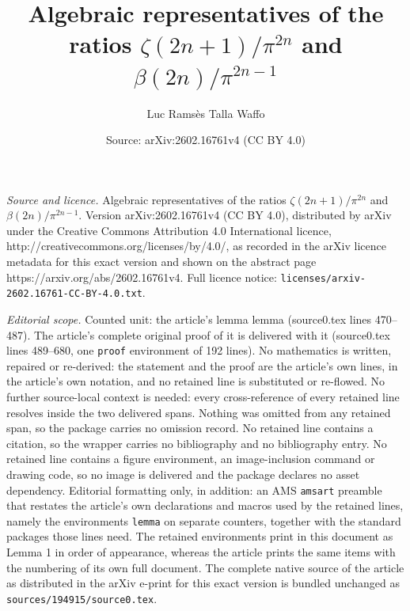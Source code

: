 \documentclass[10pt,a4paper]{amsart}
\title{Algebraic representatives of the ratios $\zeta(2n+1)/\pi^{2n}$ and $\beta(2n)/\pi^{2n-1}$}
\author{Luc Rams\`es Talla Waffo}
\date{Source: arXiv:2602.16761v4 (CC BY 4.0)}
\newtheorem{lemma}{Lemma}
\begin{document}
\maketitle

\noindent\emph{Source and licence.} Algebraic representatives of the ratios $\zeta(2n+1)/\pi^{2n}$ and $\beta(2n)/\pi^{2n-1}$. Version arXiv:2602.16761v4 (CC BY 4.0), distributed by arXiv under the Creative Commons Attribution 4.0 International licence, http://creativecommons.org/licenses/by/4.0/, as recorded in the arXiv licence metadata for this exact version and shown on the abstract page https://arxiv.org/abs/2602.16761v4. Full licence notice: \texttt{licenses/arxiv-2602.16761-CC-BY-4.0.txt}.\par\smallskip

\noindent\textit{Editorial scope.} Counted unit: the article's lemma lemma (source0.tex lines 470--487). The article's complete original proof of it is delivered with it (source0.tex lines 489--680, one \texttt{proof} environment of 192 lines). No mathematics is written, repaired or re-derived: the statement and the proof are the article's own lines, in the article's own notation, and no retained line is substituted or re-flowed.  No further source-local context is needed: every cross-reference of every retained line resolves inside the two delivered spans.  Nothing was omitted from any retained span, so the package carries no omission record.  No retained line contains a citation, so the wrapper carries no bibliography and no bibliography entry.  No retained line contains a figure environment, an image-inclusion command or drawing code, so no image is delivered and the package declares no asset dependency.  Editorial formatting only, in addition: an AMS \texttt{amsart} preamble that restates the article's own declarations and macros used by the retained lines, namely the environments \texttt{lemma} on separate counters, together with the standard packages those lines need.  The retained environments print in this document as Lemma 1 in order of appearance, whereas the article prints the same items with the numbering of its own full document.  The complete native source of the article as distributed in the arXiv e-print for this exact version is bundled unchanged as \texttt{sources/194915/source0.tex}.
\begin{lemma}\label[lemma]{lemma:affine-series-ratio}
Let \(\alpha,\beta>0\), and let
\[
\mathbb D:=\{x\in\mathbb C:\ |x|<1\},\qquad \mathbb D^\ast:=\mathbb D\setminus(-1,0].
\]
For \(m\in\mathbb N\) and \(x\in\mathbb D^\ast\), define
\[
T_m^{(\alpha,\beta)}(x):=\sum_{n\ge0}(\alpha n+\beta)^m x^n.
\]
Then
\[
\frac1m\,\frac{T_{m+1}^{(\alpha,\beta)}(x)}{T_m^{(\alpha,\beta)}(x)}
\longrightarrow
\frac{\alpha}{-\log x},
\qquad m\to\infty,
\]
locally uniformly on \(\mathbb D^\ast\), where \(\log\) denotes the principal branch.
\end{lemma}
\end{document}
